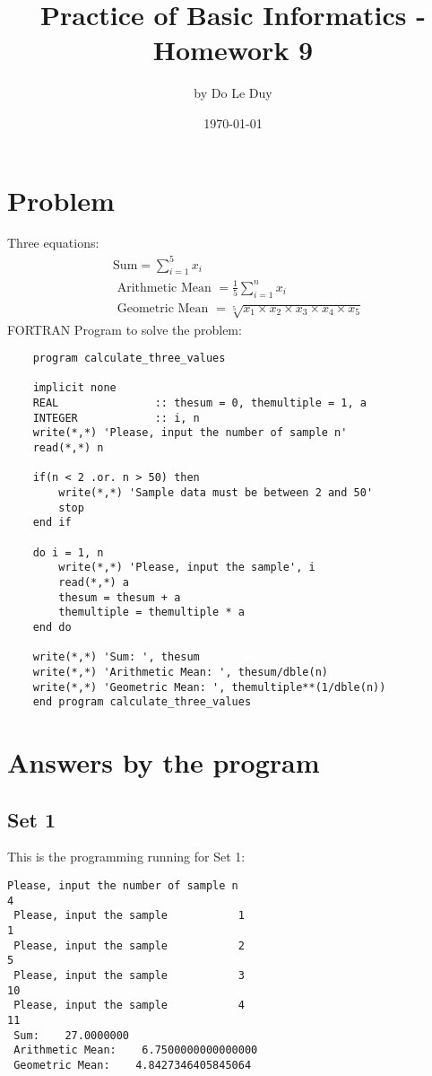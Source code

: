 \documentclass[11pt]{article}
\title{Practice of Basic Informatics - Homework 9}
\author{by Do Le Duy}
\date{\today}
\begin{document}
\maketitle
\section{Problem}
Three equations:
\begin{align*}
    &\text{Sum}=\sum_{i=1}^{5} x_{i} \\
    &\text { Arithmetic Mean }=\frac{1}{5} \sum_{i=1}^{n} x_{i} \\
    &\text { Geometric Mean }=\sqrt[5]{x_{1} \times x_{2} \times x_{3} \times x_{4} \times x_{5}}   
\end{align*}
FORTRAN Program to solve the problem:
\begin{verbatim} 
    program calculate_three_values

    implicit none
    REAL               :: thesum = 0, themultiple = 1, a
    INTEGER            :: i, n
    write(*,*) 'Please, input the number of sample n'
    read(*,*) n 

    if(n < 2 .or. n > 50) then
        write(*,*) 'Sample data must be between 2 and 50'
        stop
    end if

    do i = 1, n
        write(*,*) 'Please, input the sample', i
        read(*,*) a
        thesum = thesum + a 
        themultiple = themultiple * a
    end do

    write(*,*) 'Sum: ', thesum
    write(*,*) 'Arithmetic Mean: ', thesum/dble(n)
    write(*,*) 'Geometric Mean: ', themultiple**(1/dble(n))
    end program calculate_three_values
\end{verbatim} 

\section{Answers by the program}
\subsection{Set 1}
This is the programming running for Set 1:

\begin{verbatim}
Please, input the number of sample n
4
 Please, input the sample           1
1
 Please, input the sample           2
5
 Please, input the sample           3
10
 Please, input the sample           4
11
 Sum:    27.0000000    
 Arithmetic Mean:    6.7500000000000000     
 Geometric Mean:    4.8427346405845064     
    
\end{verbatim}
\end{document}
